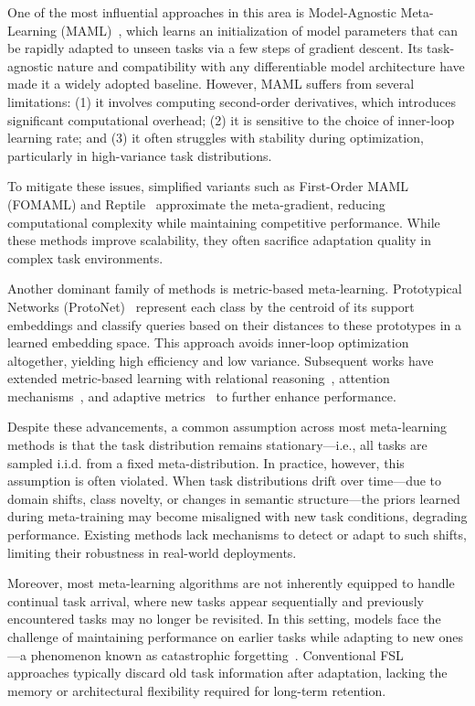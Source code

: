 \documentclass[conference]{IEEEtran}
\begin{document}
One of the most influential approaches in this area is Model-Agnostic Meta-Learning (MAML)~\cite{finn2017}, which learns an initialization of model parameters that can be rapidly adapted to unseen tasks via a few steps of gradient descent. Its task-agnostic nature and compatibility with any differentiable model architecture have made it a widely adopted baseline. However, MAML suffers from several limitations: (1) it involves computing second-order derivatives, which introduces significant computational overhead; (2) it is sensitive to the choice of inner-loop learning rate; and (3) it often struggles with stability during optimization, particularly in high-variance task distributions.

To mitigate these issues, simplified variants such as First-Order MAML (FOMAML) and Reptile~\cite{nichol2018} approximate the meta-gradient, reducing computational complexity while maintaining competitive performance. While these methods improve scalability, they often sacrifice adaptation quality in complex task environments.

Another dominant family of methods is metric-based meta-learning. Prototypical Networks (ProtoNet)~\cite{snell2017} represent each class by the centroid of its support embeddings and classify queries based on their distances to these prototypes in a learned embedding space. This approach avoids inner-loop optimization altogether, yielding high efficiency and low variance. Subsequent works have extended metric-based learning with relational reasoning~\cite{sung2018relationnet}, attention mechanisms~\cite{oreshkin2018tadam}, and adaptive metrics~\cite{zhang2020deepemd} to further enhance performance.

Despite these advancements, a common assumption across most meta-learning methods is that the task distribution remains stationary—i.e., all tasks are sampled i.i.d. from a fixed meta-distribution. In practice, however, this assumption is often violated. When task distributions drift over time—due to domain shifts, class novelty, or changes in semantic structure—the priors learned during meta-training may become misaligned with new task conditions, degrading performance. Existing methods lack mechanisms to detect or adapt to such shifts, limiting their robustness in real-world deployments.

Moreover, most meta-learning algorithms are not inherently equipped to handle continual task arrival, where new tasks appear sequentially and previously encountered tasks may no longer be revisited. In this setting, models face the challenge of maintaining performance on earlier tasks while adapting to new ones—a phenomenon known as catastrophic forgetting~\cite{mccloskey1989catastrophic}. Conventional FSL approaches typically discard old task information after adaptation, lacking the memory or architectural flexibility required for long-term retention.
\end{document}
